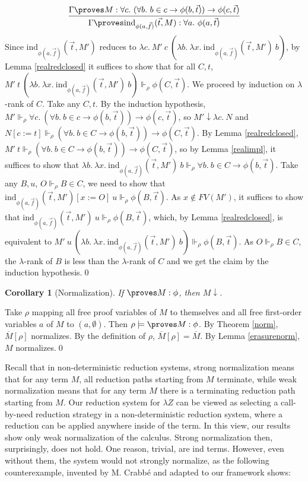 \documentclass{LMCS}
\newtheorem{corollary}[thm]{Corollary}
\newcommand{\ov}[1]{\ensuremath{\overline{#1}}}
\newcommand\reals{\ensuremath{\Vdash}}
\newcommand{\p}{\proves}
\newcommand{\gp}{\Gamma \proves}
\newcommand{\rrho}{\reals_\rho}
\newcommand{\pl}[1]{\ensuremath{\mathrm{#1}}}
\newcommand{\IND}{\pl{ind}}
\newcommand{\li}{\lambda Z}
\begin{document}
\begin{enumerate}[$\bullet$]
\[
\infer{\gp \IND_{\phi(a, \vec{f})}(\vec{t}, M) : \forall a.\
\phi(a, \vec{t})}{\gp M : \forall c.\ (\forall b.\ b \in c \to \phi(b,
\vec{t})) \to \phi(c, \vec{t})}
\]
Since $\IND_{\phi(a, \vec{f})}(\vec{t}, M')$ reduces to $\lambda c.\ M'\ c\ (\lambda b.\ \lambda x.\
\IND_{\phi(a, \vec{f})}(\vec{t}, M')\ b)$, by Lemma \ref{realredclosed} it suffices to show that for all $C, t$,
$M'\ t\ (\lambda b.\ \lambda x.\ \IND_{\phi(a, \vec{f})}(\vec{t}, M')\ b) \rrho \phi(C,
\vec{t})$. We proceed by induction on $\lambda$-rank of $C$. Take any $C, t$. 
By the induction hypothesis, $M' \reals_\rho \forall c.\ (\forall b.\ b \in c \to \phi(b, \vec{t}))
\to \phi(c, \vec{t})$, so $M' \downarrow \lambda c.\ N$ and $N[c:=t] \rrho (\forall
b.\ b \in C \to \phi(b, \vec{t})) \to \phi(C, \vec{t})$. By Lemma
\ref{realredclosed}, $M'\ t \rrho (\forall
b.\ b \in C \to \phi(b, \vec{t})) \to \phi(C, \vec{t})$, so 
by Lemma \ref{realimpl}, it suffices to
show that $\lambda b.\ \lambda x.\ \IND_{\phi(a, \vec{f})}(\vec{t}, M')\ b \rrho \forall b.\ b \in C \to \phi(b, \vec{t})$.
Take any $B, u$, $O \rrho B \in C$, we need to show that
$\IND_{\phi(a, \vec{f})}(\vec{t}, M')[x:=O]\ u \rrho \phi(B, \vec{t})$. As $x \notin FV(M')$, it suffices
to show that $\IND_{\phi(a, \vec{f})}(\vec{t}, M')\ u \rrho
\phi(B, \vec{t})$, which, by Lemma \ref{realredclosed}, is equivalent to $M'\
u\ (\lambda b.\ \lambda x.\ \IND_{\phi(a, \vec{f})}(\vec{t}, M')\ b) \rrho \phi(B, \vec{t})$. 
As $O \rrho B \in C$, the $\lambda$-rank of $B$ is less than the
$\lambda$-rank of $C$ and we get the claim by the induction hypothesis.\qed
\end{enumerate}

\begin{corollary}[Normalization]\label{cornorm}
If $\proves M : \phi$, then $M \downarrow$. 
\end{corollary}
\proof Take $\rho$ mapping all free proof variables of $M$ to themselves
and all free first-order variables $a$ of $M$ to $(a, \emptyset)$. 
Then $\rho \models \p M : \phi$. By Theorem \ref{norm}, $\ov{M}[\rho]$
normalizes. By the definition of $\rho$, $\ov{M}[\rho] = \ov{M}$. By Lemma
\ref{erasurenorm}, $M$ normalizes.\qed


Recall that in non-deterministic reduction systems, strong normalization means
that for any term $M$, all reduction paths starting from $M$ terminate, while weak normalization means
that for any term $M$ there is a terminating reduction path starting from
$M$. Our reduction system for $\li$ can be viewed as selecting a call-by-need reduction
strategy in a non-deterministic reduction system, where a reduction can be
applied anywhere inside of the term. In this view, our results show only
weak normalization of the calculus. Strong normalization then, surprisingly, does not hold. One reason, trivial, are
$\IND$ terms. However, even without them, the system would not strongly
normalize, as the following counterexample, invented by M. Crabb\'e and adapted to our framework shows:
\end{document}
